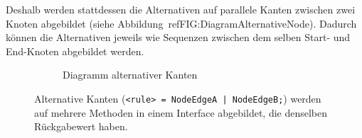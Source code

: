 \documentclass[../InterneDSLs.tex]{subfiles}
\begin{document}
Deshalb werden stattdessen die Alternativen auf parallele Kanten zwischen zwei Knoten abgebildet (siehe Abbildung~ref{FIG:DiagramAlternativeNode}). Dadurch können die Alternativen jeweils wie Sequenzen zwischen dem selben Start- und End-Knoten abgebildet werden.
\begin{figure}[ht]
\centering
  \begin{subfigure}[c]{0.49\textwidth}
    \caption{Diagramm alternativer Kanten}
    \label{FIG:DiagramAlternativeNode}
  \end{subfigure}
  \begin{subfigure}[c]{0.49\textwidth}
    
  \end{subfigure}
  \caption{Alternative Kanten (\texttt{<rule> = NodeEdgeA | NodeEdgeB;}) werden auf mehrere Methoden in einem Interface abgebildet, die denselben Rückgabewert haben.}
  \label{FIG:AlternativeNode}
\end{figure}
\end{document}
